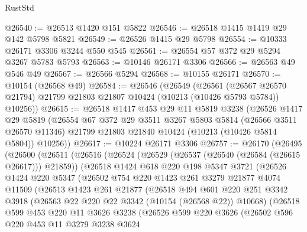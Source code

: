 \begin{lexlean}{RustStd}
\begin{coremodule}
{\begin{coremodule}
{{{{{{{{{{{{{{{{{{{{{{{{{{@26540 := @26513 @1420 @151 @5822
@26546 := @26518 @1415 @1419 @29 @142 @5798 @5821
@26549 := @26526 @1415 @29 @5798
@26554 := @10333 @26171 @3306 @3244 @550 @545
@26561 := @26554 @57 @372 @29 @5294 @3267 @5783 @5793
@26563 := @10146 @26171 @3306
@26566 := @26563 @49 @546 @49
@26567 := @26566 @5294
@26568 := @10155 @26171
@26570 := @10154 (@26568 @49)
@26584 := @26546
    (@26549
      (@26561
        (@26567 @26570 @21794)
        @21799
        @21803
        @21807
        @10424
        (@10213 (@10426 @5793 @5784))
        @10256))
@26615 := @26518
    @1417
    @453
    @29
    @11
    @5819
    @3238
    (@26526
      @1417
      @29
      @5819
      (@26554
        @67
        @372
        @29
        @3511
        @3267
        @5803
        @5814
        (@26566 @3511 @26570 @11346)
        @21799
        @21803
        @21840
        @10424
        (@10213 (@10426 @5814 @5804))
        @10256))
@26617 := @10224 @26171 @3306
@26757 := @26170
    (@26495
      (@26500
        (@26511
          (@26516
            (@26524
              (@26529 (@26537 (@26540 (@26584 (@26615 @26617))) @21859))
              (@26518
                @1424
                @618
                @220
                @198
                @5347
                @3721
                (@26526
                  @1424
                  @220
                  @5347
                  (@26502
                    @754
                    @220
                    @1423
                    @261
                    @3279
                    @21877
                    @4074
                    @11509
                    (@26513
                      @1423
                      @261
                      @21877
                      (@26518
                        @494
                        @601
                        @220
                        @251
                        @3342
                        @3918
                        (@26563 @22 @220 @22 @3342 (@10154 (@26568 @22)) @10668)
                        (@26518
                          @599
                          @453
                          @220
                          @11
                          @3626
                          @3238
                          (@26526
                            @599
                            @220
                            @3626
                            (@26502
                              @596
                              @220
                              @453
                              @11
                              @3279
                              @3238
                              @3624
}}}}}}}}}}}}}}}}}}}}}}}}}}
\end{coremodule}}
\end{coremodule}
\end{lexlean}
